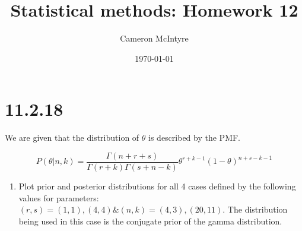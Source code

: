 \documentclass[svgnames]{article}
\title{Statistical methods: Homework 12}
\author{Cameron McIntyre}
\date{\today}
\begin{document}
\maketitle

\section{11.2.18}

We are given that the distribution of $\theta$ is described by the PMF.

$$P(\theta | n ,k) = \frac{\Gamma (n + r +s)}{\Gamma(r+k)\Gamma(s+ n - k)}\theta^{r + k -1}(1-\theta)^{n+s-k-1}$$

\begin{enumerate}[label = \alph*.]

\item Plot prior and posterior distributions for all 4 cases defined by the following values for parameters: $(r,s)=(1,1),(4,4)\&(n,k)= (4,3),(20,11)$.
\newline
The distribution being used in this case is the conjugate prior of the gamma distribution.


\end{enumerate}
\end{document}
